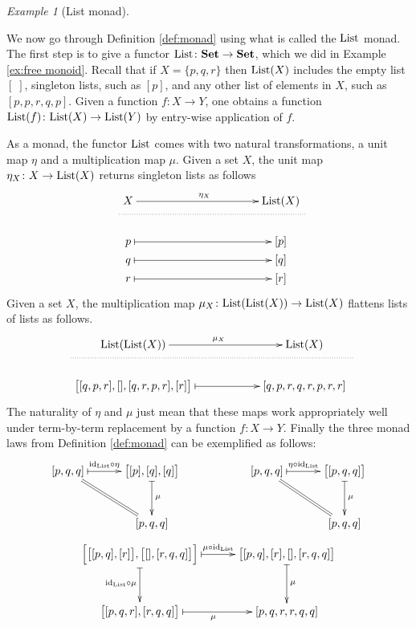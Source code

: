 \documentclass{book}
\def\tn{\textnormal}
\def\List{\tn{List}}
\def\to{\rightarrow}
\def\taking{\colon}
\def\id{\tn{id}}
\def\Set{{\bf Set}}
\theoremstyle{remark}
\newtheorem{example}[subsubsection]{Example}
\theoremstyle{definition}
\begin{document}
\begin{example}[List monad]\label{ex:monad}

We now go through Definition \ref{def:monad} using what is called the $\List$ monad. The first step is to give a functor $\List\taking\Set\to\Set$, which we did in Example \ref{ex:free monoid}. Recall that if $X=\{p,q,r\}$ then $\List(X)$ includes the empty list $[\;]$, singleton lists, such as $[p]$, and any other list of elements in $X$, such as $[p,p,r,q,p]$. Given a function $f\taking X\to Y$, one obtains a function $\List(f)\taking\List(X)\to\List(Y)$ by entry-wise application of $f$.

As a monad, the functor $\List$ comes with two natural transformations, a unit map $\eta$ and a multiplication map $\mu$. Given a set $X$, the unit map $\eta_X\taking X\to\List(X)$ returns singleton lists as follows
$$\xymatrix@=.5pt{
&X\ar[rr]^{\eta_X}&\hspace{1.4in}&\List(X)\\
\ar@{..}[rrr]+<.3in,0pt>&&&\\\\\\
&p\ar@{|->}[rr]&&[p]\\
&q\ar@{|->}[rr]&&[q]\\
&r\ar@{|->}[rr]&&[r]}$$
Given a set $X$, the multiplication map $\mu_X\taking\List(\List(X))\to\List(X)$ flattens lists of lists as follows.
$$\xymatrix@=.5pt{
&\List(\List(X))\ar[rr]^{\mu_X}&\hspace{.7in}&\List(X)\\
\ar@{..}[rrr]+<.6in,0pt>&&&\\\\\\
&\big[[q, p, r], [], [q, r, p, r], [r]\big]\ar@{|->}[rr]&&[q, p, r, q, r, p, r, r]}$$
The naturality of $\eta$ and $\mu$ just mean that these maps work appropriately well under term-by-term replacement by a function $f\taking X\to Y$. Finally the three monad laws from Definition \ref{def:monad} can be exemplified as follows:
$$\xymatrix@=30pt{[p, q, q]\ar@{|->}[r]^-{\id_\List\circ\eta}\ar@{=}[rd]&\big[[p], [q], [q]\big]\ar@{|->}[d]^\mu\\&[p, q, q]}\hspace{.8in}
\xymatrix@=30pt{[p, q, q]\ar@{|->}[r]^-{\eta\circ\id_\List}\ar@{=}[rd]&\big[[p, q, q]\big]\ar@{|->}[d]^\mu\\&[p,q,q]}$$
\vspace{.1in}
$$\xymatrix@=30pt{\Big[\big[[p, q], [r]\big], \big[[], [r, q, q]\big]\Big]\ar@{|->}[r]^-{\mu\circ\id_\List}\ar@{|->}[d]_{\id_\List\circ\mu}&\big[[p, q], [r], [], [r, q, q]\big]\ar@{|->}[d]^\mu\\\big[[p, q, r], [r, q, q]\big]\ar@{|->}[r]_\mu&[p, q, r, r, q,q]}$$

\end{example}
\end{document}

